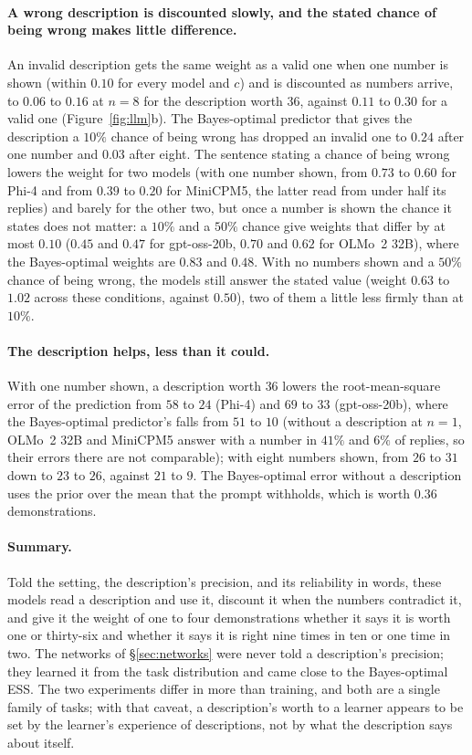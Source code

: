 \documentclass[10pt,twocolumn]{article}
\begin{document}
\paragraph{A wrong description is discounted slowly, and the stated chance of being wrong makes little difference.} An invalid description gets the same weight as a valid one when one number is shown (within $0.10$ for every model and $c$) and is discounted as numbers arrive, to $0.06$ to $0.16$ at $n = 8$ for the description worth $36$, against $0.11$ to $0.30$ for a valid one (Figure~\ref{fig:llm}b). The Bayes-optimal predictor that gives the description a $10\%$ chance of being wrong has dropped an invalid one to $0.24$ after one number and $0.03$ after eight. The sentence stating a chance of being wrong lowers the weight for two models (with one number shown, from $0.73$ to $0.60$ for Phi-4 and from $0.39$ to $0.20$ for MiniCPM5, the latter read from under half its replies) and barely for the other two, but once a number is shown the chance it states does not matter: a $10\%$ and a $50\%$ chance give weights that differ by at most $0.10$ ($0.45$ and $0.47$ for gpt-oss-20b, $0.70$ and $0.62$ for OLMo~2 32B), where the Bayes-optimal weights are $0.83$ and $0.48$. With no numbers shown and a $50\%$ chance of being wrong, the models still answer the stated value (weight $0.63$ to $1.02$ across these conditions, against $0.50$), two of them a little less firmly than at $10\%$.

\paragraph{The description helps, less than it could.} With one number shown, a description worth $36$ lowers the root-mean-square error of the prediction from $58$ to $24$ (Phi-4) and $69$ to $33$ (gpt-oss-20b), where the Bayes-optimal predictor's falls from $51$ to $10$ (without a description at $n = 1$, OLMo~2 32B and MiniCPM5 answer with a number in $41\%$ and $6\%$ of replies, so their errors there are not comparable); with eight numbers shown, from $26$ to $31$ down to $23$ to $26$, against $21$ to $9$. The Bayes-optimal error without a description uses the prior over the mean that the prompt withholds, which is worth $0.36$ demonstrations.

\paragraph{Summary.} Told the setting, the description's precision, and its reliability in words, these models read a description and use it, discount it when the numbers contradict it, and give it the weight of one to four demonstrations whether it says it is worth one or thirty-six and whether it says it is right nine times in ten or one time in two. The networks of \S\ref{sec:networks} were never told a description's precision; they learned it from the task distribution and came close to the Bayes-optimal ESS. The two experiments differ in more than training, and both are a single family of tasks; with that caveat, a description's worth to a learner appears to be set by the learner's experience of descriptions, not by what the description says about itself.
\end{document}
